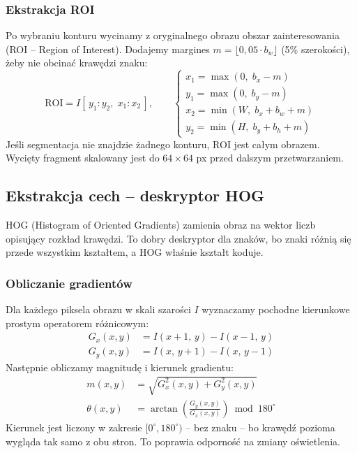 \documentclass[12pt,oneside]{article}
\begin{document}
\subsubsection{Ekstrakcja ROI}
Po wybraniu konturu wycinamy z oryginalnego obrazu obszar zainteresowania (ROI --
Region of Interest). Dodajemy margines $m = \lfloor 0{,}05 \cdot b_w \rfloor$
(5\% szerokości), żeby nie obcinać krawędzi znaku:
\begin{equation}
    \text{ROI} = I[\,y_1:y_2,\; x_1:x_2\,], \qquad
    \begin{cases}
        x_1 = \max(0,\; b_x - m) \\
        y_1 = \max(0,\; b_y - m) \\
        x_2 = \min(W,\; b_x + b_w + m) \\
        y_2 = \min(H,\; b_y + b_h + m)
    \end{cases}
    \label{eq:roi}
\end{equation}
Jeśli segmentacja nie znajdzie żadnego konturu, ROI jest całym obrazem. Wycięty
fragment skalowany jest do $64 \times 64$ px przed dalszym przetwarzaniem.

\subsection{Ekstrakcja cech -- deskryptor HOG}
HOG (Histogram of Oriented Gradients) zamienia obraz na wektor liczb
opisujący rozkład krawędzi. To dobry deskryptor dla znaków, bo znaki różnią się
przede wszystkim kształtem, a HOG właśnie kształt koduje.

\subsubsection{Obliczanie gradientów}
Dla każdego piksela obrazu w skali szarości $I$ wyznaczamy pochodne kierunkowe
prostym operatorem różnicowym:
\begin{align}
    G_x(x,y) &= I(x+1,\,y) - I(x-1,\,y)\\
    G_y(x,y) &= I(x,\,y+1) - I(x,\,y-1)
\end{align}
Następnie obliczamy magnitudę i kierunek gradientu:
\begin{align}
    m(x,y)      &= \sqrt{G_x^2(x,y) + G_y^2(x,y)}
    \label{eq:magnitude}\\
    \theta(x,y) &= \arctan\!\left(\frac{G_y(x,y)}{G_x(x,y)}\right)
                   \bmod 180^\circ
    \label{eq:orientation}
\end{align}
Kierunek jest liczony w zakresie $[0^\circ, 180^\circ)$ -- bez znaku -- bo krawędź
pozioma wygląda tak samo z obu stron. To poprawia odporność na zmiany oświetlenia.
\end{document}
